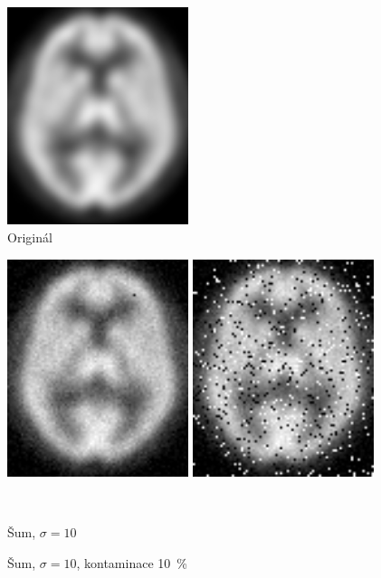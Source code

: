     \vfill
    \begin{figure}[htp]
        \center
        \begin{minipage}[c]{0.5\textwidth}
            \center
            \includegraphics[width = 150pt]{src/8Appendix/final/original.png}
            \caption{Originál}
        \end{minipage}
     \end{figure}
     \begin{figure}[h]
        \begin{minipage}[l]{0.5\textwidth}
            \center
            \includegraphics[width = 150pt]{src/8Appendix/final/10-100noise.png}
        \end{minipage}
        \begin{minipage}[r]{0.5\textwidth}
            \center
            \includegraphics[width = 150pt]{src/8Appendix/final/10-100contaminated.png}
        \end{minipage}
        \\
        \begin{minipage}[l]{0.5\textwidth}
            \caption{Šum, $\sigma = 10$}
        \end{minipage}
        \begin{minipage}[r]{0.5\textwidth}
            \caption{Šum, $\sigma = 10$, kontaminace 10~\%}
        \end{minipage}
    \end{figure}

